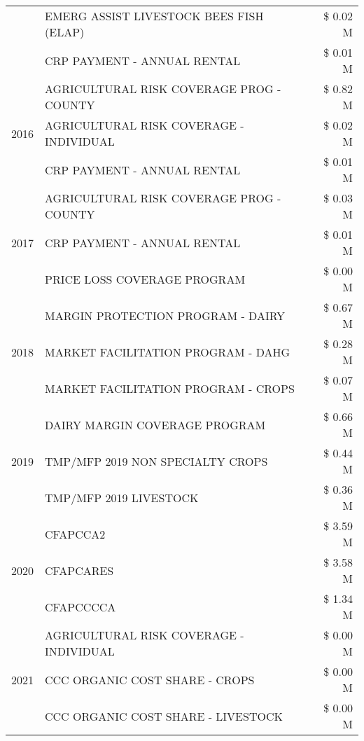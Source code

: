 \begin{tabular}{llr}
 & EMERG ASSIST LIVESTOCK BEES FISH (ELAP) & \$ 0.02 M \\
 & CRP PAYMENT - ANNUAL RENTAL & \$ 0.01 M \\
\cline{1-3}
\multirow[t]{3}{*}{2016} & AGRICULTURAL RISK COVERAGE PROG - COUNTY & \$ 0.82 M \\
 & AGRICULTURAL RISK COVERAGE - INDIVIDUAL & \$ 0.02 M \\
 & CRP PAYMENT - ANNUAL RENTAL & \$ 0.01 M \\
\cline{1-3}
\multirow[t]{3}{*}{2017} & AGRICULTURAL RISK COVERAGE PROG - COUNTY & \$ 0.03 M \\
 & CRP PAYMENT - ANNUAL RENTAL & \$ 0.01 M \\
 & PRICE LOSS COVERAGE PROGRAM & \$ 0.00 M \\
\cline{1-3}
\multirow[t]{3}{*}{2018} & MARGIN PROTECTION PROGRAM - DAIRY & \$ 0.67 M \\
 & MARKET FACILITATION PROGRAM - DAHG & \$ 0.28 M \\
 & MARKET FACILITATION PROGRAM - CROPS & \$ 0.07 M \\
\cline{1-3}
\multirow[t]{3}{*}{2019} & DAIRY MARGIN COVERAGE PROGRAM & \$ 0.66 M \\
 & TMP/MFP 2019 NON SPECIALTY CROPS & \$ 0.44 M \\
 & TMP/MFP 2019 LIVESTOCK & \$ 0.36 M \\
\cline{1-3}
\multirow[t]{3}{*}{2020} & CFAPCCA2 & \$ 3.59 M \\
 & CFAPCARES & \$ 3.58 M \\
 & CFAPCCCCA & \$ 1.34 M \\
\cline{1-3}
\multirow[t]{3}{*}{2021} & AGRICULTURAL RISK COVERAGE - INDIVIDUAL & \$ 0.00 M \\
 & CCC ORGANIC COST SHARE - CROPS & \$ 0.00 M \\
 & CCC ORGANIC COST SHARE - LIVESTOCK & \$ 0.00 M \\
\cline{1-3}
\bottomrule
\end{tabular}
